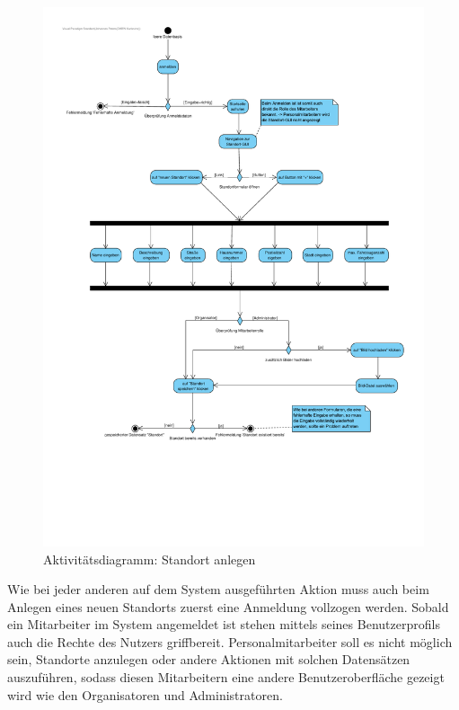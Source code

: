 \begin{figure}[!ht]
    \centering
    \includegraphics[width=\textwidth, height=\textheight-3cm, trim = 0cm 3cm 0cm 0cm]{Bilder/Diagramme/AD_Standort_anlegen.pdf}
    \caption{Aktivitätsdiagramm: Standort anlegen}
    \label{img:ad_standort}
\end{figure}

Wie bei jeder anderen auf dem System ausgeführten Aktion muss auch beim Anlegen eines neuen Standorts zuerst eine Anmeldung vollzogen werden. Sobald ein Mitarbeiter im System angemeldet ist stehen mittels seines Benutzerprofils auch die Rechte des Nutzers griffbereit. Personalmitarbeiter soll es nicht möglich sein, Standorte anzulegen oder andere Aktionen mit solchen Datensätzen auszuführen, sodass diesen Mitarbeitern eine andere Benutzeroberfläche gezeigt wird wie den Organisatoren und Administratoren. 



